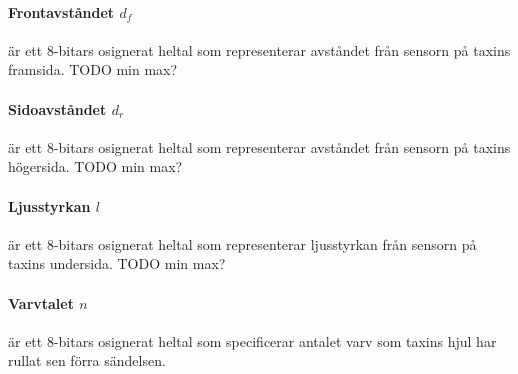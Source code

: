 \documentclass[designspec/spec.tex]{subfiles}
\begin{document}
\paragraph{Frontavståndet $d_f$} är ett 8-bitars osignerat heltal som
representerar avståndet från sensorn på taxins framsida. TODO min max?

\paragraph{Sidoavståndet $d_r$} är ett 8-bitars osignerat heltal som
representerar avståndet från sensorn på taxins högersida. TODO min max?

\paragraph{Ljusstyrkan $l$} är ett 8-bitars osignerat heltal som representerar
ljusstyrkan från sensorn på taxins undersida. TODO min max?

\paragraph{Varvtalet $n$} är ett 8-bitars osignerat heltal som specificerar
antalet varv som taxins hjul har rullat sen förra sändelsen.
\end{document}
